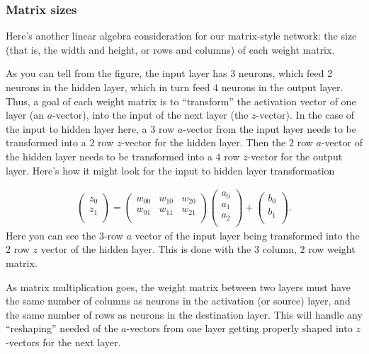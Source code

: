 \documentclass[12pt]{article}
\begin{document}
\subsubsection{Matrix sizes}

Here's another linear algebra consideration for our matrix-style network: the size (that is, the width and height, or rows and columns) of each weight matrix.  

As you can tell from the figure, the input layer has 3 neurons, which feed 2 neurons in the hidden layer, which in turn feed 4 neurons in the output layer. Thus, a goal of each weight matrix is to ``transform'' the activation vector of one layer (an $a$-vector), into the input of the next layer (the $z$-vector). In the case of the input to hidden layer here, a $3$ row $a$-vector from the input layer needs to be transformed into a $2$ row $z$-vector for the hidden layer.  Then the $2$ row $a$-vector of the hidden layer needs to be transformed into a $4$ row $z$-vector for the output layer. Here's how it might look for the input to hidden layer transformation

 \begin{align}
    \begin{pmatrix}
           z_{0} \\
           z_{1} \\
         \end{pmatrix}
=
   \begin{pmatrix}
           w_{00} &w_{10} & w_{20}  \\
           w_{01} &w_{11} & w_{21}  \\
         \end{pmatrix}
     \begin{pmatrix}
           a_{0} \\
           a_{1} \\
           a_{2} \\
         \end{pmatrix}
+
    \begin{pmatrix}
           b_{0} \\
           b_{1} \\
         \end{pmatrix}.
  \end{align}
Here you can see the $3$-row $a$ vector of the input layer being transformed into the $2$ row $z$ vector of the hidden layer. This is done with the $3$ column, $2$ row weight matrix.  

As matrix multiplication goes, the weight matrix between two layers must have the same number of columns as neurons in the activation (or source) layer, and the same number of rows as neurons in the destination layer.  This will handle any ``reshaping'' needed of the $a$-vectors from one layer getting properly shaped into $z$-vectors for the next layer.
\end{document}
